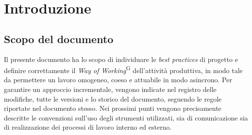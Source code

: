 \documentclass[5pt]{article}
\begin{document}
\pagebreak
\tableofcontents
\pagebreak

\section{Introduzione}

\subsection{Scopo del documento}
Il presente documento ha lo scopo di individuare le \textit{best practices} di progetto e definire correttamente il \textit{Way of Working}\textsuperscript{G} dell'attività produttiva, in modo tale da permettere un lavoro omogeneo, coeso e attuabile in modo asincrono. Per garantire un approccio incrementale, vengono indicate nel registro delle modifiche, tutte le versioni e lo storico del documento, seguendo le regole riportate nel documento stesso. Nei prossimi punti vengono precisamente descritte le convenzioni sull'uso degli strumenti utilizzati, sia di comunicazione sia di realizzazione dei processi di lavoro interno ed esterno.
\end{document}

